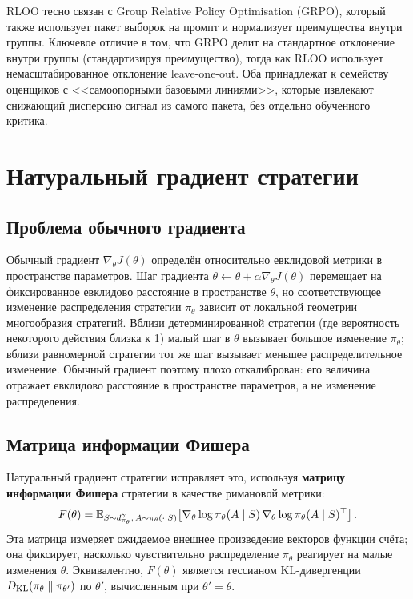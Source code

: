 \begin{remark}
\label{rem:rloo-grpo}
RLOO тесно связан с Group Relative Policy Optimisation (GRPO), который также использует пакет выборок на промпт и нормализует преимущества внутри группы. Ключевое отличие в том, что GRPO делит на стандартное отклонение внутри группы (стандартизируя преимущество), тогда как RLOO использует немасштабированное отклонение leave-one-out. Оба принадлежат к семейству оценщиков с <<самоопорными базовыми линиями>>, которые извлекают снижающий дисперсию сигнал из самого пакета, без отдельно обученного критика.
\end{remark}

\section{Натуральный градиент стратегии}
\label{sec:npg}


\subsection{Проблема обычного градиента}

Обычный градиент $\nabla_\theta J(\theta)$ определён относительно евклидовой метрики в пространстве параметров. Шаг градиента $\theta \leftarrow \theta + \alpha \nabla_\theta J(\theta)$ перемещает на фиксированное евклидово расстояние в пространстве $\theta$, но соответствующее изменение распределения стратегии $\pi_\theta$ зависит от локальной геометрии многообразия стратегий. Вблизи детерминированной стратегии (где вероятность некоторого действия близка к 1) малый шаг в $\theta$ вызывает большое изменение $\pi_\theta$; вблизи равномерной стратегии тот же шаг вызывает меньшее распределительное изменение. Обычный градиент поэтому плохо откалиброван: его величина отражает евклидово расстояние в пространстве параметров, а не изменение распределения.

\subsection{Матрица информации Фишера}


Натуральный градиент стратегии исправляет это, используя \textbf{матрицу информации Фишера} стратегии в качестве римановой метрики:
\begin{equation}
\label{eq:fisher}
F(\theta) = \operatorname{\mathbb{E}}_{S \sim d^{\gamma}_{\pi_\theta},\, A \sim \pi_\theta(\cdot \mid S)}\!\left[\nabla_\theta \log \pi_\theta(A \mid S)\, \nabla_\theta \log \pi_\theta(A \mid S)^\top\right].
\end{equation}
Эта матрица измеряет ожидаемое внешнее произведение векторов функции счёта; она фиксирует, насколько чувствительно распределение $\pi_\theta$ реагирует на малые изменения $\theta$. Эквивалентно, $F(\theta)$ является гессианом KL-дивергенции $D_{\mathrm{KL}}\!\left(\pi_\theta\;\|\;\pi_{\theta'}\right)$ по $\theta'$, вычисленным при $\theta' = \theta$.

